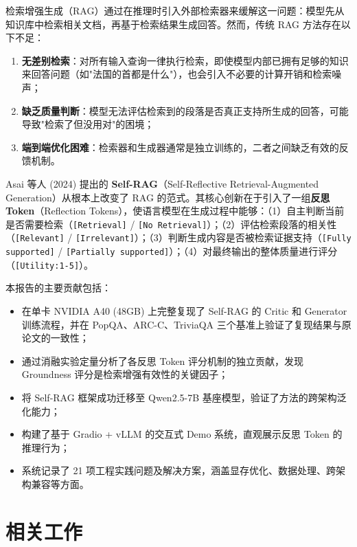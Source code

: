 \documentclass[11pt,a4paper]{article}
\begin{document}
检索增强生成（RAG）通过在推理时引入外部检索器来缓解这一问题：模型先从知识库中检索相关文档，再基于检索结果生成回答。然而，传统 RAG 方法存在以下不足：
\begin{enumerate}[leftmargin=2em]
    \item \textbf{无差别检索}：对所有输入查询一律执行检索，即使模型内部已拥有足够的知识来回答问题（如"法国的首都是什么"），也会引入不必要的计算开销和检索噪声；
    \item \textbf{缺乏质量判断}：模型无法评估检索到的段落是否真正支持所生成的回答，可能导致"检索了但没用对"的困境；
    \item \textbf{端到端优化困难}：检索器和生成器通常是独立训练的，二者之间缺乏有效的反馈机制。
\end{enumerate}

Asai 等人 (2024) 提出的 \textbf{Self-RAG}（Self-Reflective Retrieval-Augmented Generation）从根本上改变了 RAG 的范式。其核心创新在于引入了一组\textbf{反思 Token}（Reflection Tokens），使语言模型在生成过程中能够：（1）自主判断当前是否需要检索（\texttt{[Retrieval]} / \texttt{[No Retrieval]}）；（2）评估检索段落的相关性（\texttt{[Relevant]} / \texttt{[Irrelevant]}）；（3）判断生成内容是否被检索证据支持（\texttt{[Fully supported]} / \texttt{[Partially supported]}）；（4）对最终输出的整体质量进行评分（\texttt{[Utility:1-5]}）。

本报告的主要贡献包括：
\begin{itemize}[leftmargin=2em]
    \item 在单卡 NVIDIA A40 (48GB) 上完整复现了 Self-RAG 的 Critic 和 Generator 训练流程，并在 PopQA、ARC-C、TriviaQA 三个基准上验证了复现结果与原论文的一致性；
    \item 通过消融实验定量分析了各反思 Token 评分机制的独立贡献，发现 Groundness 评分是检索增强有效性的关键因子；
    \item 将 Self-RAG 框架成功迁移至 Qwen2.5-7B 基座模型，验证了方法的跨架构泛化能力；
    \item 构建了基于 Gradio + vLLM 的交互式 Demo 系统，直观展示反思 Token 的推理行为；
    \item 系统记录了 21 项工程实践问题及解决方案，涵盖显存优化、数据处理、跨架构兼容等方面。
\end{itemize}

\section{相关工作}
\label{sec:related}
\end{document}
